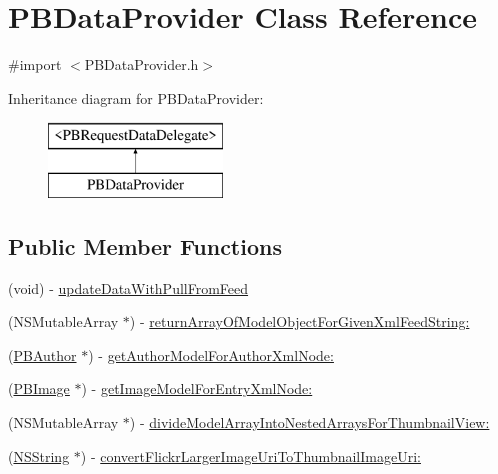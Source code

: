 \hypertarget{interface_p_b_data_provider}{
\section{PBDataProvider Class Reference}
\label{interface_p_b_data_provider}
}


{\ttfamily \#import $<$PBDataProvider.h$>$}

Inheritance diagram for PBDataProvider:\begin{figure}[H]
\begin{center}
\leavevmode
\includegraphics[height=2cm]{interface_p_b_data_provider}
\end{center}
\end{figure}
\subsection*{Public Member Functions}
\begin{DoxyCompactItemize}
\item 
(void) -\/ \hyperlink{interface_p_b_data_provider_a3acc1d48d6270ed90a9700c024994d98}{updateDataWithPullFromFeed}
\item 
(NSMutableArray $\ast$) -\/ \hyperlink{interface_p_b_data_provider_aa087e818d083884b3244df839cfcf2b2}{returnArrayOfModelObjectForGivenXmlFeedString:}
\item 
(\hyperlink{interface_p_b_author}{PBAuthor} $\ast$) -\/ \hyperlink{interface_p_b_data_provider_ab4f175fcbd505518c33cd0b2b6686a98}{getAuthorModelForAuthorXmlNode:}
\item 
(\hyperlink{interface_p_b_image}{PBImage} $\ast$) -\/ \hyperlink{interface_p_b_data_provider_a550f8f74323fc7a204620dfff3bc8183}{getImageModelForEntryXmlNode:}
\item 
(NSMutableArray $\ast$) -\/ \hyperlink{interface_p_b_data_provider_a129757ab9da93b336fd706ada8ce639d}{divideModelArrayIntoNestedArraysForThumbnailView:}
\item 
(\hyperlink{class_n_s_string}{NSString} $\ast$) -\/ \hyperlink{interface_p_b_data_provider_aa5a04b738e7467fb33e515fe70e8377f}{convertFlickrLargerImageUriToThumbnailImageUri:}
\end{DoxyCompactItemize}
